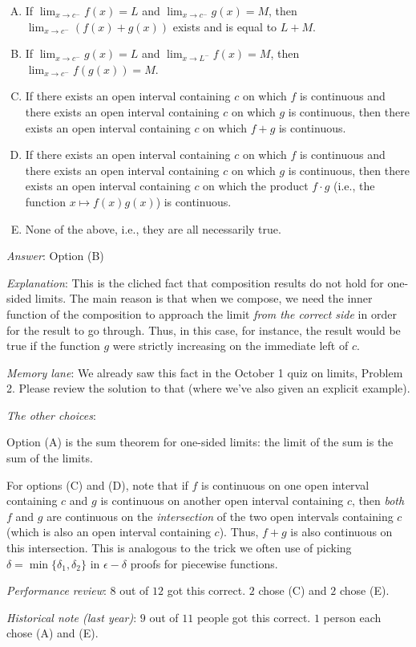 \documentclass[10pt]{amsart}
\begin{document}
\begin{enumerate}
  \begin{enumerate}[(A)]
  \item If $\lim_{x \to c^-} f(x) = L$ and $\lim_{x \to c^-} g(x) =
    M$, then $\lim_{x \to c^-} (f(x) + g(x))$ exists and is equal to
    $L + M$.
  \item If $\lim_{x \to c^-} g(x) = L$ and $\lim_{x \to L^-} f(x) =
    M$, then $\lim_{x \to c^-} f(g(x)) = M$.
  \item If there exists an open interval containing $c$ on which $f$
    is continuous and there exists an open interval containing $c$
    on which $g$ is continuous, then there exists an open interval
    containing $c$ on which $f + g$ is continuous.
  \item If there exists an open interval containing $c$ on which $f$
    is continuous and there exists an open interval containing $c$ on
    which $g$ is continuous, then there exists an open interval
    containing $c$ on which the product $f \cdot g$ (i.e., the
    function $x \mapsto f(x)g(x)$) is continuous.
  \item None of the above, i.e., they are all necessarily true.
  \end{enumerate}

  {\em Answer}: Option (B)

  {\em Explanation}: This is the cliched fact that composition results
  do not hold for one-sided limits. The main reason is that when we
  compose, we need the inner function of the composition to approach
  the limit {\em from the correct side} in order for the result to go
  through. Thus, in this case, for instance, the result would be true
  if the function $g$ were strictly increasing on the immediate left
  of $c$.

  {\em Memory lane}: We already saw this fact in the October 1 quiz on
  limits, Problem 2. Please review the solution to that (where we've
  also given an explicit example).

  {\em The other choices}:

  Option (A) is the sum theorem for one-sided limits: the limit of the
  sum is the sum of the limits.

  For options (C) and (D), note that if $f$ is continuous on one open
  interval containing $c$ and $g$ is continuous on another open
  interval containing $c$, then {\em both} $f$ and $g$ are continuous
  on the {\em intersection} of the two open intervals containing $c$
  (which is also an open interval containing $c$). Thus, $f + g$ is
  also continuous on this intersection. This is analogous to the trick
  we often use of picking $\delta = \min \{ \delta_1, \delta_2 \}$ in
  $\epsilon-\delta$ proofs for piecewise functions.

  {\em Performance review}: $8$ out of $12$ got this correct. $2$
  chose (C) and $2$ chose (E).

  {\em Historical note (last year)}: $9$ out of $11$ people got this
  correct. $1$ person each chose (A) and (E).


\end{enumerate}
\end{document}
